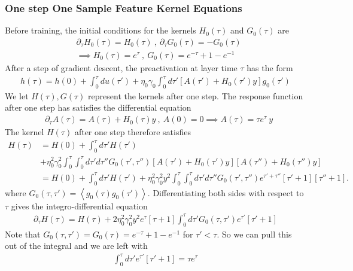 \documentclass{article} %
\begin{document}
\subsubsection{One step One Sample Feature Kernel Equations}\label{app:linear_one_step}

Before training, the initial conditions for the kernels $H_0(\tau)$ and $G_0(\tau)$ are 
\begin{align}
    &\partial_\tau H_0(\tau) = H_0(\tau) \ , \ \partial_\tau G_0(\tau) = - G_0(\tau) \nonumber
    \\
    &\implies H_0(\tau) = e^\tau  \ , \ G_0(\tau) = e^{-\tau} + 1 - e^{-1}
\end{align}
After a step of gradient descent, the preactivation at layer time $\tau$ has the form
\begin{align}
    h(\tau) = h(0) + \int_0^\tau du(\tau') + \eta_0 \gamma_0 \int_0^\tau d\tau' [ A(\tau') +  H_0(\tau') y ] g_0(\tau')
\end{align}
We let $H(\tau),G(\tau)$ represent the kernels after one step. The response function after one step has satisfies the differential equation
\begin{align}
    &\partial_\tau {A}(\tau) = A(\tau) + H_0(\tau) y  \ , \ A(0) = 0 
    \implies {A}(\tau) =   \tau e^{\tau} \ y
\end{align}
The kernel $H(\tau)$ after one step therefore satisfies
\begin{align}
    H(\tau) &= H(0) + \int_0^\tau d\tau' H(\tau') \nonumber
    \\
    &+ \eta_0^2 \gamma_0^2 \int_0^\tau \int_0^\tau d\tau' d\tau'' G_0(\tau',\tau'') [ A(\tau') + H_0(\tau')y ] [ A(\tau'') + H_0(\tau'')y ] \nonumber
    \\
    &= H(0) + \int_0^\tau d\tau' H(\tau') + \eta_0^2 \gamma_0^2 y^2 \int_0^\tau \int_0^\tau d\tau' d\tau'' G_0(\tau',\tau'') e^{\tau' + \tau''} [\tau' + 1][\tau''+1] .
\end{align}
where $G_0(\tau,\tau') = \left< g_0(\tau) g_0(\tau') \right>$. Differentiating both sides with respect to $\tau$ gives the integro-differential equation
\begin{align}
    \partial_\tau H(\tau) = H(\tau) + 2 \eta_0^2 \gamma_0^2 y^2 e^{\tau} [\tau + 1] \int_0^\tau d\tau' G_0(\tau,\tau') e^{\tau'} [\tau' + 1]
\end{align}
Note that $G_0(\tau,\tau') = G_0(\tau) = e^{-\tau} +1 -e^{-1}$ for $\tau' < \tau$. So we can pull this out of the integral and we are left with
\begin{align}
    \int_0^\tau d\tau' e^{\tau'} [\tau' + 1] = \tau e^{\tau}
\end{align}
\end{document}
